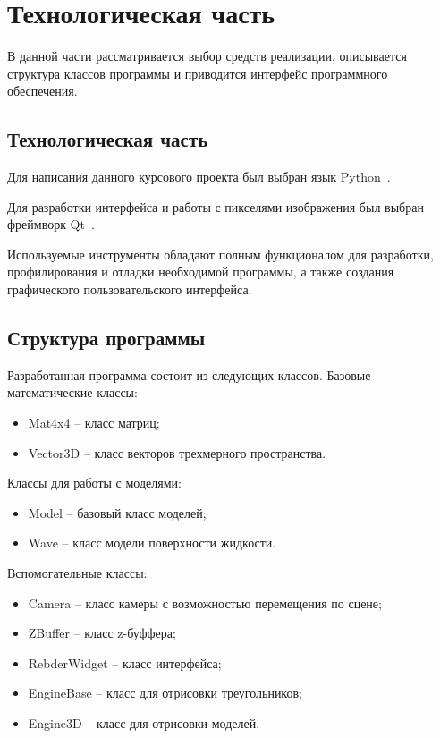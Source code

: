 \chapter{Технологическая часть}

В данной части рассматривается выбор средств реализации, описывается структура классов программы и приводится интерфейс программного обеспечения.

\section{Технологическая часть}

Для написания данного курсового проекта был выбран язык Python~\cite{python}.

Для разработки интерфейса и работы с пикселями изображения был выбран фреймворк Qt~\cite{qt-framefork}.

Используемые инструменты обладают полным функционалом для разработки, профилирования и отладки необходимой программы, а также создания графического пользовательского интерфейса.


\section{Структура программы}
Разработанная программа состоит из следующих классов. 
Базовые математические классы:
\begin{itemize}[label*=---]
    \item Mat4x4 -- класс матриц;
    \item Vector3D -- класс векторов трехмерного пространства.
\end{itemize}

Классы для работы с моделями:
\begin{itemize}[label*=---]
    \item Model -- базовый класс моделей;
    \item Wave -- класс модели поверхности жидкости.
\end{itemize}

Вспомогательные классы:
\begin{itemize}[label*=---]
    \item Camera -- класс камеры с возможностью перемещения по сцене;
    \item ZBuffer -- класс z-буффера;
    \item RebderWidget -- класс интерфейса;
    \item EngineBase -- класс для отрисовки треугольников;
    \item Engine3D -- класс для отрисовки моделей.
\end{itemize}


